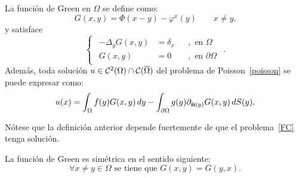 \documentclass[../edp.tex]{subfiles}
\begin{document}
\begin{Definicion}
	La función de Green en \(\Omega\) se define como:
	\begin{equation}\label{Green}
		G(x,y) = \Phi(x-y) - \varphi^{x}(y)
		\qquad x\ne y.
	\end{equation}
	y satisface
	\begin{displaymath}
	\begin{cases}
	\begin{aligned}
		-\Delta_{y} G(x,y) &= \delta_{x} &&,\text{ en } \Omega\\
		G(x,y) &= 0 &&,\text{ en } \partial\Omega
	\end{aligned}
	\end{cases}.
	\end{displaymath}
	Además, toda solución \(u\in\mathcal{C}^{2}(\Omega)\cap\mathcal{C}(\overline\Omega)\) 
	del problema de Poisson~\eqref{poisson} se puede expresar
	como:
	\begin{displaymath}
		u(x)
		=
		\int_{\Omega}
			f(y) G(x,y) \, dy
		-
		\int_{\partial\Omega}
			g(y) \partial_{\hat{\textbf{n}}(y) } G(x,y) \, dS(y).
	\end{displaymath}
\end{Definicion}

Nótese que la definición anterior depende fuertemente de que 
el problema~\eqref{FC} tenga solución.

\begin{Teorema}
	La función de Green es simétrica en el sentido siguiente:
	\begin{displaymath}
		\forall x\ne y\in \Omega
		\text{ se tiene que }
		G(x,y) = G(y,x).
	\end{displaymath}
\end{Teorema}
\end{document}
